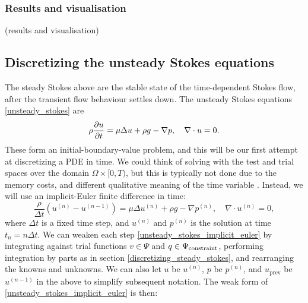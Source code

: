 \subsubsection{Results and visualisation}
\vskip 0.2in
(results and visualisation)
\vskip 0.2in
\subsection{Discretizing the unsteady Stokes equations}\label{discretizing_unsteady_stokes}
\newcommand{\uprev}{{u_{\text{prev}}}}
The steady Stokes above are the stable state of the time-dependent Stokes flow,
after the transient flow behaviour settles down. The unsteady Stokes equations \eqref{unsteady_stokes} are
\begin{equation*}
    \rho\frac{\partial u}{\partial t} = \mu\Delta u + \rho g - \nabla p, \quad \nabla\cdot u = 0.
\end{equation*}
These form an initial-boundary-value problem, and this will be our first attempt at discretizing a PDE in time.
We could think of solving with the test and trial spaces over the domain $\Omega \times [0, T)$, but this is typically not done due to the memory costs,
and different qualitative meaning of the time variable \cite{ham_fem}. Instead, we will use an implicit-Euler finite difference in time: 
\begin{equation}\label{unsteady_stokes_implicit_euler}
    \frac{\rho}{\Delta t} \left(u^{(n)} - u^{(n-1)}\right) = \mu\Delta u^{(n)} + \rho g - \nabla p^{(n)}, \quad \nabla\cdot u^{(n)} = 0,
\end{equation}
where $\Delta t$ is a fixed time step, and $u^{(n)}$ and $p^{(n)}$ is the solution at time $t_n = n\Delta t$. We can weaken each step
\eqref{unsteady_stokes_implicit_euler}
by integrating against trial functions $v \in \Psi$ and $q \in {\Psi_{\text{constraint}}}$, performing integration by parts as in section \ref{discretizing_steady_stokes},
and rearranging the knowns and unknowns. We can also let $u$ be $u^{(n)}$, $p$ be $p^{(n)}$, and $\uprev$ be $u^{(n-1)}$ in the above to simplify
subsequent notation. The weak form of \eqref{unsteady_stokes_implicit_euler} is then:
